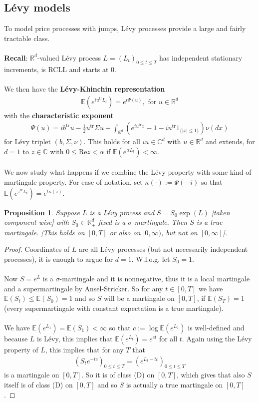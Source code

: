 \documentclass[12pt,a4paper, twoside]{article}
\newtheorem{prop}{Proposition}[section]
\theoremstyle{definition}
\newcommand{\EE}{\mathbb{E}} %
\begin{document}
\subsection{Lévy models}
To model price processes with jumps, Lévy processes provide a large and fairly tractable class. 
\\\\
\textbf{Recall}: $\mathbb{R}^d$-valued Lévy process $L=(L_t)_{0 \leq t \leq T}$ has independent stationary increments, is RCLL and starts at $0$. \\
\\
We then have the \textbf{Lévy-Khinchin representation} \begin{align*}
\EE(e^{iu^\text{tr}L_t})= e^{t \Psi(u)}, \text{ for } u \in \mathbb{R}^d
\end{align*}
with the \textbf{characteristic exponent} 
\begin{align*}
\Psi(u)= ib^\text{tr}u- \frac{1}{2}u^\text{tr} \Sigma u + \int_{\mathbb{R}^d } \left( e^{iu^\text{tr}x}-1-iu^\text{tr} 1_{\{ |x| \leq 1\}} \right) \nu (dx)
\end{align*}
for Lévy triplet $(b, \Sigma, \nu)$. This holds for all $iu \in \mathbb{C}^d$ with $u \in \mathbb{R}^d$ and extends, for $d=1$ to $z \in \mathbb{C}$ with $0 \leq \text{Re}z < \alpha$ if $\EE(e^{ \alpha L_t}) < \infty$. \\\\
We now study what happens if we combine the Lévy property with some kind of martingale property. For ease of notation, set $\kappa( \cdot):= \Psi(-i)$ so that $\mathbb{E}(e^{z^\text{tr} L_t}) = e^{t \kappa(z)}$. 
\begin{prop} \label{P59} Suppose $L$ is a Lévy process and $S=S_0 \exp(L)$ [taken component wise] with $S_0 \in \mathbb{R}_+^d$ fixed is a $\sigma$-martingale. Then $S$ is a true martingale. [This holds on $[0,T]$ or also on $[0, \infty)$, but not on $[0, \infty]$].
\end{prop}
\begin{proof}
Coordinates of $L$ are all Lévy processes (but not necessarily independent processes), it is enough to argue for $d=1$. W.l.o.g. let $S_0=1$. \\\\
Now $S=e^L$ is a $\sigma$-martingale and it is nonnegative, thus it is a local martingale and a supermartingale by Ansel-Stricker. So for any $t \in [0,T]$ we have $\EE(S_t) \leq \EE(S_0)=1$ and so $S$ will be a martingale on $[0,T]$, if $\EE(S_T)=1$ (every supermartingale with constant expectation is a true martingale). 
\\\\
We have $\mathbb{E}(e^{L_1})= \mathbb{E}(S_1) < \infty$ so that $c:= \log \mathbb{E}(e^{L_1})$ is well-defined and because $L$ is Lévy, this implies that $\mathbb{E}(e^{L_t})= e^{ct}$ for all $t$. Again using the Lévy property of $L$, this implies that for any $T$ that 
\begin{align*}
(S_te^{-tc})_{0 \leq t \leq T} = ( e^{L_t-tc})_{0 \leq t \leq T}
\end{align*}
is a martingale on $[0,T]$. So it is of class (D) on $[0,T]$, which gives that also $S$ itself is of class (D) on $[0,T]$ and so $S$ is actually a true martingale on $[0,T]$. 
\end{proof}
\end{document}
